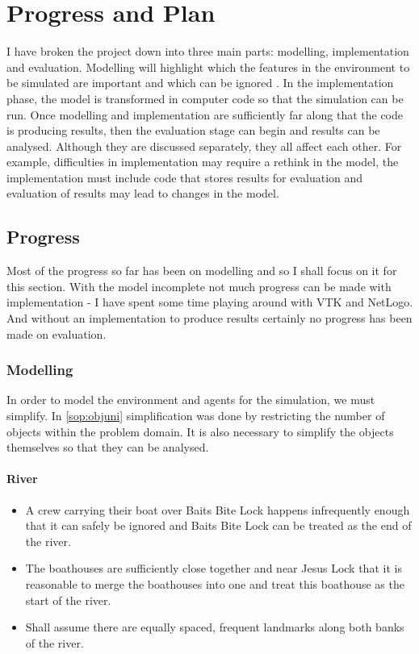 \chapter{Progress and Plan}

I have broken
the project down into three main parts: modelling,
implementation and evaluation. Modelling will highlight which the features in the
environment to be simulated are important and which can be ignored
\cite{Sterling2009}. In the implementation phase, the model is transformed in
computer code so that the simulation can be run. Once modelling and
implementation are sufficiently far along that the code is producing
results, then the evaluation stage can begin and results can be
analysed. Although they are discussed separately, they all affect each
other. For example, difficulties in implementation may require a rethink in the
model, the implementation must include code that stores results for
evaluation and evaluation of results may lead to changes in the model.

\section{Progress}
Most of the progress so far has been on modelling and so I shall focus
on it for this section. With the model incomplete not much progress
can be made with implementation - I have spent some time playing
around with VTK and NetLogo. And without an implementation to produce
results certainly no progress has been made on evaluation.

\subsection{Modelling} \label{prog:model}
In order to model the environment and agents for the simulation, we
must simplify. In \ref{sop:objuni} simplification was done by
restricting the number of 
objects within the problem domain. It is also necessary to
simplify the objects themselves so that they can be analysed.

\subsubsection{River}
\begin{itemize}
  \item A crew carrying their boat over Baits Bite Lock happens
    infrequently enough that it can safely be ignored and Baits Bite
    Lock can be treated as the end of the river.
  \item The boathouses are sufficiently close together and near Jesus
    Lock that it is reasonable to merge the boathouses into one and
    treat this boathouse as the start of the river. 
  \item Shall assume there are equally spaced, frequent landmarks
    along both banks of the river.
\end{itemize}

